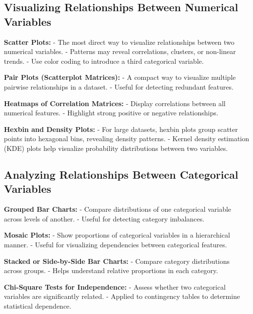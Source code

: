 \documentclass[12pt,openany]{book}
\begin{document}
\subsection{Visualizing Relationships Between Numerical Variables}

\textbf{Scatter Plots:}
- The most direct way to visualize relationships between two numerical variables.
- Patterns may reveal correlations, clusters, or non-linear trends.
- Use color coding to introduce a third categorical variable.
\newline

\textbf{Pair Plots (Scatterplot Matrices):}
- A compact way to visualize multiple pairwise relationships in a dataset.
- Useful for detecting redundant features.
\newline

\textbf{Heatmaps of Correlation Matrices:}
- Display correlations between all numerical features.
- Highlight strong positive or negative relationships.
\newline

\textbf{Hexbin and Density Plots:}
- For large datasets, hexbin plots group scatter points into hexagonal bins, revealing density patterns.
- Kernel density estimation (KDE) plots help visualize probability distributions between two variables.
\newline

\subsection{Analyzing Relationships Between Categorical Variables}

\textbf{Grouped Bar Charts:}
- Compare distributions of one categorical variable across levels of another.
- Useful for detecting category imbalances.
\newline

\textbf{Mosaic Plots:}
- Show proportions of categorical variables in a hierarchical manner.
- Useful for visualizing dependencies between categorical features.
\newline

\textbf{Stacked or Side-by-Side Bar Charts:}
- Compare category distributions across groups.
- Helps understand relative proportions in each category.
\newline

\textbf{Chi-Square Tests for Independence:}
- Assess whether two categorical variables are significantly related.
- Applied to contingency tables to determine statistical dependence.
\newline
\end{document}
